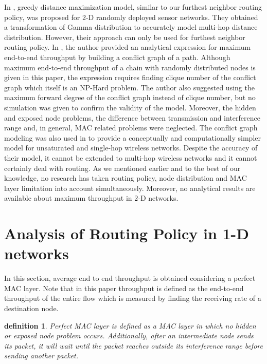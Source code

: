 \documentclass[12pt, draftclsnofoot, onecolumn]{IEEEtran}
\newtheorem{definition}[theorem]{definition}
\begin{document}
In \cite{vural2010multihop}, greedy distance maximization model, similar to our furthest neighbor routing policy, was proposed for 2-D randomly deployed sensor networks. They obtained a transformation of Gamma distribution to accurately model multi-hop distance distribution. However, their approach can only be used for furthest neighbor routing policy.
In \cite{ref22}, the author provided an analytical expression for maximum 
end-to-end throughput by building a conflict graph of a path. Although 
maximum end-to-end throughput of a chain with randomly distributed 
nodes is given in this paper, the expression requires finding clique number 
of the conflict graph which itself is an NP-Hard problem. The author also 
suggested using the maximum forward degree of the conflict graph instead of 
clique number, but no simulation was given to confirm the validity of the 
model. Moreover, the hidden and exposed node problems, the difference between transmission 
and interference range and, in general, 
 MAC related problems were neglected. The conflict graph modeling was also used in \cite{stojanova2017conflict} to 
provide a conceptually and computationally simpler model for unsaturated and single-hop wireless networks.
Despite the accuracy of their model, it cannot be extended to multi-hop wireless networks and it cannot certainly deal with routing.
As we mentioned earlier and to the best of our knowledge, no research has 
taken routing policy, node distribution and MAC layer limitation into account 
simultaneously. Moreover, no analytical results are available about maximum 
throughput in $2$-D networks. 



\section{Analysis of Routing Policy in 1-D networks}
\label{routingAnalysis}


In this section, average end to end throughput is obtained considering a  
perfect MAC layer. Note that in this paper throughput is defined as the end-to-end throughput of the entire flow which is measured by finding the receiving rate of a destination node.

\begin{definition} 
Perfect MAC layer is defined as a MAC layer in which no 
hidden or exposed node problem occurs. Additionally, after an intermediate 
node sends its packet, it will wait until the packet reaches outside its 
interference range before sending another packet.
\end{definition} 
\end{document}
